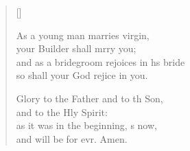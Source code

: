 \begin{verse}[\versewidth]
\begin{patverse}
As a young man marries  virgin,\Med\\
your Builder shall mrry you;\\
and as a bridegroom rejoices in h\pointup{\i}s bride\Med\\
so shall your God rejice in you.

Glory to the Father and to th Son,\Med\\
    and to the Hly Spirit:\\
as it was in the beginning, \pointup{\i}s now,\Med\\
    and will be for evr. Amen.
  \end{patverse}
\end{verse}
